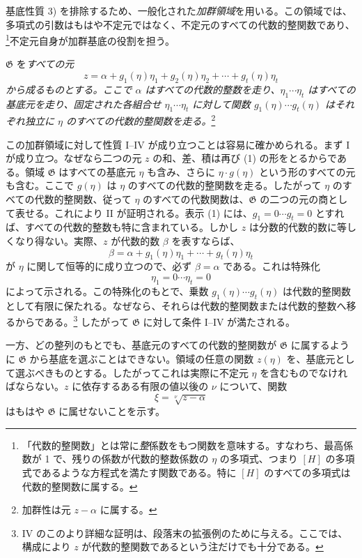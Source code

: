 基底性質 3) を排除するため、一般化された\emph{加群領域}を用いる。この領域では、多項式の引数はもはや不定元ではなく、不定元のすべての代数的整関数であり、\footnote{「代数的整関数」とは常に\emph{整}係数をもつ関数を意味する。すなわち、最高係数が 1 で、残りの係数が代数的整数係数の $\eta$ の多項式、つまり $[H]$ の多項式であるような方程式を満たす関数である。特に $[H]$ のすべての多項式は代数的整関数に属する。}不定元自身が加群基底の役割を担う。

$\mathfrak G$ を\emph{すべての元}
\begin{equation}
 z=\alpha+g_1(\eta)\eta_1+g_2(\eta)\eta_2+\cdots+g_t(\eta)\eta_t
\tag{1}
\end{equation}
\emph{から成るものとする。ここで $\alpha$ はすべての代数的整数を走り、$\eta_1\cdots\eta_t$ はすべての基底元を走り、固定された各組合せ $\eta_1\cdots\eta_t$ に対して関数 $g_1(\eta)\cdots g_t(\eta)$ はそれぞれ独立に $\eta$ のすべての代数的整関数を走る。}\footnote{加群性は元 $z-\alpha$ に属する。}

この加群領域に対して性質 I--IV が成り立つことは容易に確かめられる。まず I が成り立つ。なぜなら二つの元 $z$ の和、差、積は再び (1) の形をとるからである。領域 $\mathfrak G$ はすべての基底元 $\eta$ も含み、さらに $\eta\cdot g(\eta)$ という形のすべての元も含む。ここで $g(\eta)$ は $\eta$ のすべての代数的整関数を走る。したがって $\eta$ のすべての代数的整関数、従って $\eta$ のすべての代数関数は、$\mathfrak G$ の二つの元の商として表せる。これにより II が証明される。表示 (1) には、$g_1=0\cdots g_t=0$ とすれば、すべての代数的整数も特に含まれている。しかし $z$ は分数的代数的数に等しくなり得ない。実際、$z$ が代数的数 $\beta$ を表すならば、
\[
 \beta=\alpha+g_1(\eta)\eta_1+\cdots+g_t(\eta)\eta_t
\]
が $\eta$ に関して恒等的に成り立つので、必ず $\beta=\alpha$ である。これは特殊化
\[
 \eta_1=0\cdots \eta_t=0
\]
によって示される。この特殊化のもとで、乗数 $g_1(\eta)\cdots g_t(\eta)$ は代数的整関数として有限に保たれる。なぜなら、それらは代数的整関数または代数的整数へ移るからである。\footnote{IV のこのより詳細な証明は、段落末の拡張例のために与える。ここでは、構成により $z$ が代数的整関数であるという注だけでも十分である。} したがって $\mathfrak G$ に対して条件 I--IV が満たされる。

一方、どの整列のもとでも、基底元のすべての代数的整関数が $\mathfrak G$ に属するように $\mathfrak G$ から基底を選ぶことはできない。領域の任意の関数 $z(\eta)$ を、基底元として選ぶべきものとする。したがってこれは実際に不定元 $\eta$ を含むものでなければならない。$z$ に依存するある有限の値以後の $\nu$ について、関数
\[
 \xi=\sqrt[\nu]{z-\alpha}
\]
はもはや $\mathfrak G$ に属せないことを示す。

